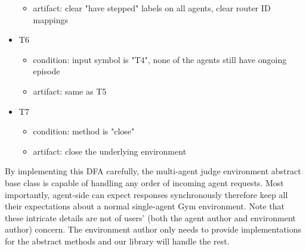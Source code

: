 \begin{itemize}
\begin{itemize}
        \item artifact: clear "have stepped" labels on all agents, clear router ID mappings
    \end{itemize}
    \item T6
    \begin{itemize}
        \item condition: input symbol is "T4", none of the agents still have ongoing episode
        \item artifact: same as T5
    \end{itemize}
    \item T7
    \begin{itemize}
        \item condition: method is "close"
        \item artifact: close the underlying environment
    \end{itemize}
\end{itemize}

By implementing this DFA carefully, the multi-agent judge environment abstract base class is capable of handling any order of incoming agent requests. Most importantly, agent-side can expect responses synchronously therefore keep all their expectations about a normal single-agent Gym environment. Note that these intricate details are not of users' (both the agent author and environment author) concern. The environment author only needs to provide implementations for the abstract methods and our library will handle the rest.